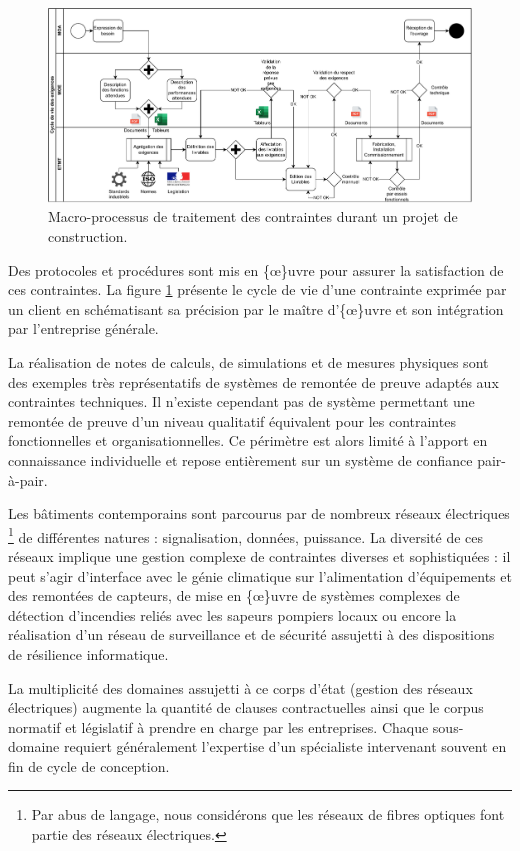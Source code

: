 \documentclass[a4paper,12pt]{article}
\begin{document}
\begin{figure}[htbp]
\centering
\includegraphics[width=.9\linewidth]{../svg/BPMN-LifeCycle-Exigences-init.pdf}
\caption{\label{fig:org53ca869}Macro-processus de traitement des contraintes durant un projet de construction.}
\end{figure}

Des protocoles et procédures sont mis en \{\oe\}uvre pour assurer la satisfaction de ces contraintes. La figure \ref{fig:org53ca869} présente le cycle de vie d'une contrainte exprimée par un client en schématisant sa précision par le maître d'\{\oe\}uvre et son intégration par l'entreprise générale.


La réalisation de notes de calculs, de simulations et de mesures physiques sont des exemples très représentatifs de systèmes de remontée de preuve adaptés aux contraintes techniques. Il n'existe cependant pas de système permettant une remontée de preuve d'un niveau qualitatif équivalent pour les contraintes fonctionnelles et organisationnelles. Ce périmètre est alors limité à l'apport en connaissance individuelle et repose entièrement sur un système de confiance pair-à-pair.

Les bâtiments contemporains sont parcourus par de nombreux réseaux électriques \footnote{Par abus de langage, nous considérons que les réseaux de fibres optiques font partie des réseaux électriques.} de différentes natures : signalisation, données, puissance. La diversité de ces réseaux implique une gestion complexe de contraintes diverses et sophistiquées : il peut s'agir d'interface avec le génie climatique sur l'alimentation d'équipements et des remontées de capteurs, de mise en \{\oe\}uvre de systèmes complexes de détection d'incendies reliés avec les sapeurs pompiers locaux ou encore la réalisation d'un réseau de surveillance et de sécurité assujetti à des dispositions de résilience informatique.

La multiplicité des domaines assujetti à ce corps d'état (gestion des réseaux électriques) augmente la quantité de clauses contractuelles ainsi que le corpus normatif et législatif à prendre en charge par les entreprises. Chaque sous-domaine requiert généralement l'expertise d'un spécialiste intervenant souvent en fin de cycle de conception.
\end{document}

